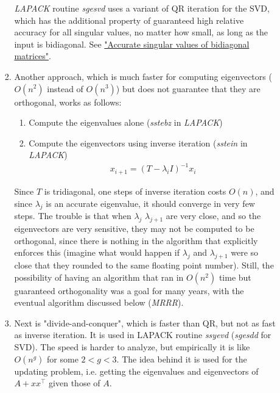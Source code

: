 \documentclass[11pt]{article}
\numberwithin{equation}{section}
\begin{document}
\begin{enumerate}
\begin{enumerate}
\begin{enumerate}
            \textit{LAPACK} routine \textit{sgesvd} uses a variant of QR iteration for the SVD, which has the additional property of guaranteed high relative accuracy for all singular values, 
            no matter how small, as long as the input is bidiagonal. See \href{https://epubs.siam.org/doi/pdf/10.1137/0911052}{"Accurate singular values of bidiagonal matrices"}.
            \item  Another approach, which is much faster for computing eigenvectors ($O(n^2)$ instead of $O(n^3)$) but does not guarantee that they are orthogonal, works as follows:
            \begin{algorithmfrm}
                \begin{enumerate}
                    \item Compute the eigenvalues alone (\textit{sstebz} in \textit{LAPACK})
                    \item Compute the eigenvectors using inverse iteration (\textit{sstein} in \textit{LAPACK}) \begin{align*}
                        x_{i+1} = \left( T - \lambda_i I \right)^{-1} x_i
                    \end{align*}
                \end{enumerate}
            \end{algorithmfrm}
            Since $T$ is tridiagonal, one steps of inverse iteration costs $O(n)$, and since $\lambda_j$ is an accurate eigenvalue, it should converge in very few steps. 
            The trouble is that when $\lambda_j$ $\lambda_{j+1}$ are very close, and so the eigenvectors are very sensitive,
            they may not be computed to be orthogonal, since there is nothing in the algorithm that explicitly enforces this 
            (imagine what would happen if $\lambda_{j}$ and $\lambda_{j+1}$ were so close that they rounded to the same floating point number). 
            Still, the possibility of having an algorithm that ran in $O(n^2)$ time but guaranteed orthogonality was a goal for many years, 
            with the eventual algorithm discussed below (\textit{MRRR}).
            \item Next is "divide-and-conquer", which is faster than QR, but not as fast as inverse iteration. It is used in LAPACK routine \textit{ssyevd} (\textit{sgesdd} for SVD).
            The speed is harder to analyze, but empirically it is like $O(n^g)$ for some $2<g<3$. The idea behind it is used for the updating problem, 
            i.e. getting the eigenvalues and eigenvectors of $A + xx^\top$ given those of $A$.

\end{enumerate}
\end{enumerate}
\end{enumerate}
\end{document}
